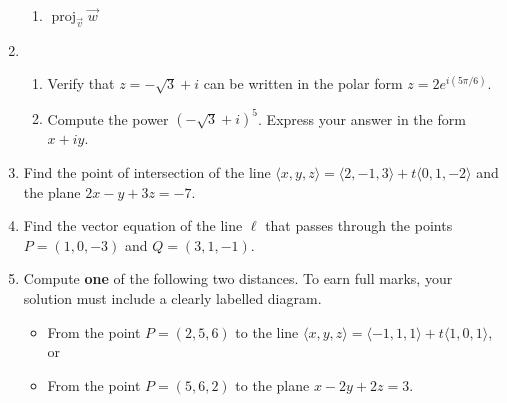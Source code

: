 \documentclass[12pt]{article}
\newcommand{\points}[1]{\marginpar{\hspace{24pt}[#1]}}
\begin{document}
\begin{enumerate}
\begin{enumerate}
 \item $\operatorname{proj}_{\vec{v}}\vec{w}$ \points{4}
\end{enumerate}
\newpage

\item 
\begin{enumerate}
 \item Verify that $z=-\sqrt{3}+i$ can be written in the polar form $z=2e^{i(5\pi/6)}$. \points{3}

\vspace{2in}

 \item Compute the power $(-\sqrt{3}+i)^5$. Express your answer in the form $x+iy$. \points{5}
\end{enumerate}

\vspace{3in}

\item Find the point of intersection of the line $\langle x,y,z\rangle = \langle 2,-1,3\rangle+t\langle 0,1,-2\rangle$ and the plane $2x-y+3z=-7$. \points{4}

\newpage

\item Find the vector equation of the line $\ell$ that passes through the points $P=(1,0,-3)$ and $Q=(3,1,-1)$. \points{4}

\vspace{3in}

\item Compute \textbf{one} of the following two distances. \points{6} To earn full marks, your solution must include a clearly labelled diagram.
\begin{itemize}
\item From the point $P=(2,5,6)$ to the line $\langle x,y,z\rangle = \langle -1,1,1\rangle + t\langle 1,0,1\rangle$, or  
\item From the point $P=(5, 6, 2)$ to the plane $x-2y+2z=3$.
\end{itemize}





\end{enumerate}
\end{document}
